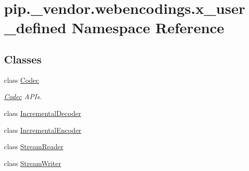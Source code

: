 \hypertarget{namespacepip_1_1__vendor_1_1webencodings_1_1x__user__defined}{}\section{pip.\+\_\+vendor.\+webencodings.\+x\+\_\+user\+\_\+defined Namespace Reference}
\label{namespacepip_1_1__vendor_1_1webencodings_1_1x__user__defined}
\subsection*{Classes}
\begin{DoxyCompactItemize}
\item 
class \hyperlink{classpip_1_1__vendor_1_1webencodings_1_1x__user__defined_1_1Codec}{Codec}
\begin{DoxyCompactList}\small\item\em \hyperlink{classpip_1_1__vendor_1_1webencodings_1_1x__user__defined_1_1Codec}{Codec} A\+P\+Is. \end{DoxyCompactList}\item 
class \hyperlink{classpip_1_1__vendor_1_1webencodings_1_1x__user__defined_1_1IncrementalDecoder}{Incremental\+Decoder}
\item 
class \hyperlink{classpip_1_1__vendor_1_1webencodings_1_1x__user__defined_1_1IncrementalEncoder}{Incremental\+Encoder}
\item 
class \hyperlink{classpip_1_1__vendor_1_1webencodings_1_1x__user__defined_1_1StreamReader}{Stream\+Reader}
\item 
class \hyperlink{classpip_1_1__vendor_1_1webencodings_1_1x__user__defined_1_1StreamWriter}{Stream\+Writer}
\end{DoxyCompactItemize}
